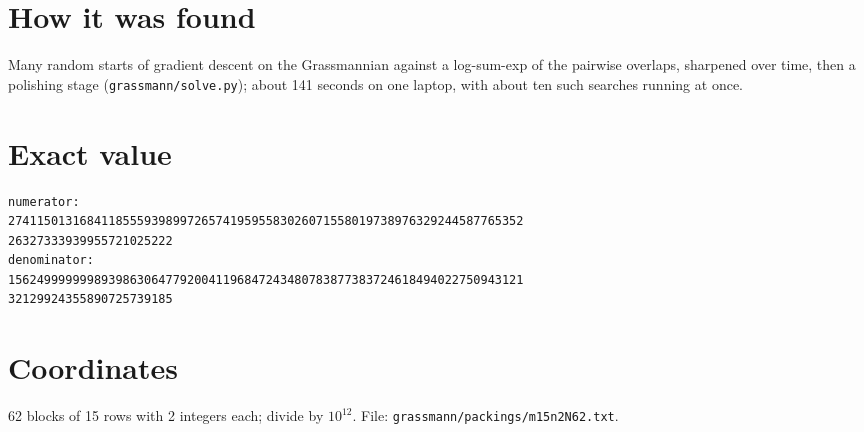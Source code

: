 \documentclass[11pt,a4paper]{article}
\begin{document}
\section{How it was found}
Many random starts of gradient descent on the Grassmannian against a log-sum-exp of the pairwise overlaps, sharpened over time, then a polishing stage (\texttt{grassmann/solve.py}); about 141 seconds on one laptop, with about ten such searches running at once.


\appendix
\section{Exact value}
{\small
\begin{verbatim}
numerator:
274115013168411855593989972657419595583026071558019738976329244587765352
26327333939955721025222
denominator:
156249999999893986306477920041196847243480783877383724618494022750943121
32129924355890725739185
\end{verbatim}}

\section{Coordinates}
62 blocks of 15 rows with 2 integers each; divide by $10^{12}$. File: \texttt{grassmann/packings/m15n2N62.txt}.
{\tiny
\begin{multicols}{4}
\end{multicols}}
\end{document}
